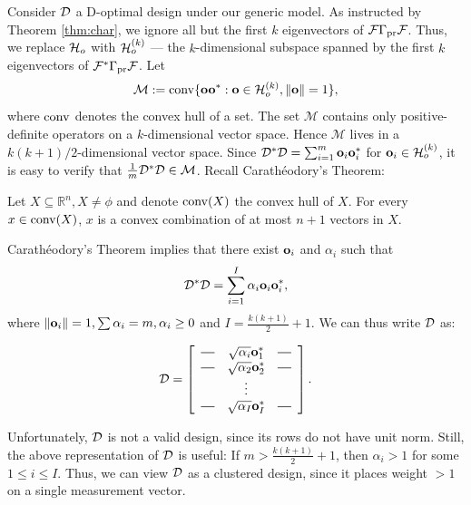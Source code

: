Consider $\mathcal{D}$ a D-optimal design under our generic model.  As
instructed by Theorem \ref{thm:char}, we ignore all but the first $k$
eigenvectors of $\mathcal{F} \Gamma_{\textup{pr}} \mathcal{F}$. Thus, we replace $\mathcal{H}_o$ with
$\mathcal{H}_o^{(k)}$ --- the $k$-dimensional subspace spanned by the first
$k$ eigenvectors of $\mathcal{F}^*\Gamma_{\textup{pr}}\mathcal{F}$. Let
\begin{equation*}
  \mathcal{M} := \conv \{\meas \meas^* : \meas\in \hilo^{(k)}, \|\meas\|=1\},
\end{equation*}
where $\operatorname*{conv}$ denotes the convex hull of a set. The set $\mathcal{M}$
contains only positive-definite operators on a $k$-dimensional vector
space. Hence $\mathcal{M}$ lives in a $k(k+1)/2$-dimensional vector
space. Since $\mathcal{D}^*\mathcal{D} = \sum_{i=1}^m \mathbf{o}_i\mathbf{o}_i^*$ for $\mathbf{o}_i
\in \mathcal{H}_o^{(k)}$, it is easy to verify that $\frac1m \mathcal{D}^*\mathcal{D} \in
\mathcal{M}$.  Recall Carath\'eodory's Theorem:
\begin{theorem*}
  Let $X \subseteq \mathbb{R}^n, X \neq \phi$ and denote $\operatorname*{conv} (X)$
  the convex hull of $X$. For every $x \in \operatorname*{conv} (X)$, $x$ is a convex
  combination of at most $n+1$ vectors in $X$.
\end{theorem*}
Carath\'eodory's Theorem implies that there exist $\mathbf{o}_i$ and
$\alpha_i$ such that
\begin{equation*}
  \opt^*\opt = \sum_{i=1}^I \alpha_i \meas_i\meas_i^*,
\end{equation*}
where $\|\mathbf{o}_i\|=1, \sum\alpha_i = m, \alpha_i \geq 0$ and $I =
\frac{k(k+1)}{2} + 1$. We can thus write $\mathcal{D}$ as:

\[
\opt =
\left[
  \begin{array}{ccc}
    \horzbar & \sqrt{\alpha_i} \meas^*_1 & \horzbar \\
    \horzbar & \sqrt{\alpha_2} \meas_2^* & \horzbar \\
             & \vdots    &          \\
    \horzbar & \sqrt{\alpha_I} \meas_I^* & \horzbar \\
  \end{array}
\right].
\]

Unfortunately, $\mathcal{D}$ is not a valid design, since its rows do not
have unit norm. Still, the above representation of $\mathcal{D}$ is useful:
If $m > \frac{k(k+1)}{2} + 1$, then $\alpha_i > 1$ for some $1\leq i
\leq I$.  Thus, we can view $\mathcal{D}$ as a clustered design, since it
places weight $>1$ on a single measurement vector.



